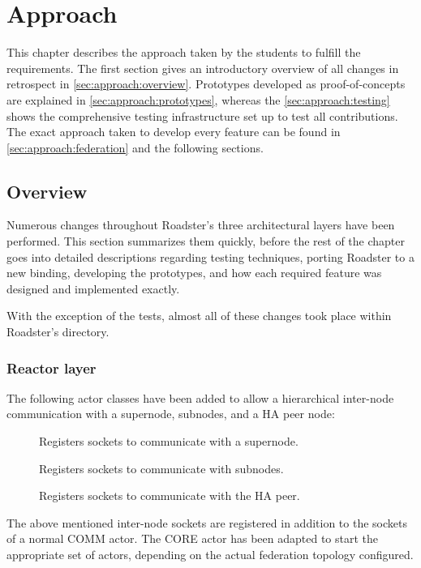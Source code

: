\chapter{Approach}\label{ch:approach}
This chapter describes the approach taken by the students to fulfill the
requirements. The first section gives an introductory overview of all changes in retrospect
in \autoref{sec:approach:overview}.
Prototypes developed as proof-of-concepts are explained in
\autoref{sec:approach:prototypes}, whereas the \autoref{sec:approach:testing}
shows the comprehensive testing infrastructure set up to test all
contributions.
The exact approach taken to develop every feature can be found in
\autoref{sec:approach:federation} and the following sections.


\section{Overview}\label{sec:approach:overview}
Numerous changes throughout Roadster's three architectural layers have been
performed. This section summarizes them quickly, before the rest of the chapter
goes into detailed descriptions regarding testing techniques, porting Roadster
to a new \zmq binding, developing the prototypes, and how each required feature
was designed and implemented exactly.

With the exception of the tests, almost all of these changes took place within
Roadster's  directory.

\subsection{Reactor layer}
The following actor classes have been added to allow a hierarchical inter-node
communication with a supernode, subnodes, and a HA peer node:
\begin{description}
	\item [] Registers sockets to communicate with a supernode.
	\item [] Registers sockets to communicate with subnodes.
	\item [] Registers sockets to communicate with the \gls{HA} peer.
\end{description}
The above mentioned inter-node sockets are registered in addition to the sockets of a normal COMM actor.
The CORE actor  has been adapted to start the
appropriate set of actors, depending on the actual federation topology
configured.

